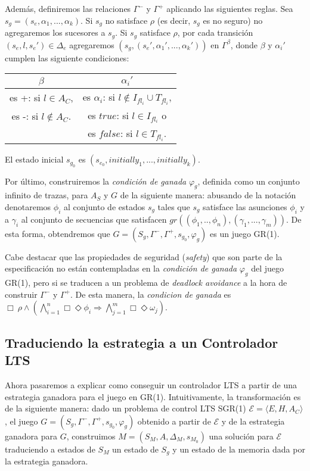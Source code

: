 Además, definiremos las relaciones $\Gamma^-$ y $\Gamma^+$ aplicando las siguientes reglas. Sea $s_g =
(s_e,\alpha_1,...,\alpha_k)$. Si $s_g$ no satisface $\rho$ (es decir, $s_g$ es no seguro) no agregaremos los sucesores a
$s_g$. Si $s_g$ satisface $\rho$, por cada transición $(s_e,l,s_e') \in \Delta_e$ agregaremos
$(s_g,(s_e',\alpha_1',...,\alpha_k'))$ en $\Gamma^{\beta}$, donde $\beta$ y $\alpha_i'$ cumplen las siguiente
condiciones:

\begin{center}
\begin{tabular}{ c | c}
$\beta$ & $\alpha_i'$ \\
\hline
es +: si $l \in A_C$, & es $\alpha_i$: si $l \notin I_{fl_i} \cup T_{fl_i}$, \\
es -: si $l \notin A_C$. & es $true$: si $l \in I_{fl_i}$ o \\
& es $false$: si $l \in T_{fl_i}$. \\
\end{tabular}
\end{center}

El estado inicial $s_{g_0}$ es $(s_{e_0},initially_1,...,initially_k)$.

Por último, construiremos la \emph{condición de ganada} $\varphi_g$, definida como un conjunto infinito de trazas, para
$A_S$ y $G$ de la siguiente manera: abusando de la notación denotaremos $\phi_i$ al conjunto de estados $s_g$ tales que
$s_g$ satisface las asunciones $\phi_i$ y a $\gamma_i$ al conjunto de secuencias que satisfacen
$gr((\phi_1,..,\phi_n),(\gamma_1,...,\gamma_m))$. De esta forma, obtendremos que $G = (S_g,\Gamma^-,\Gamma^+,s_{g_0},\varphi_g)$ es un
juego GR(1).

Cabe destacar que las propiedades de seguridad (\emph{safety}) que son parte de la especificación no están contempladas en la
\emph{condición de ganada} $\varphi_g$ del juego GR(1), pero si se traducen a un problema de \emph{deadlock avoidance} a
la hora de construir $\Gamma^-$ y $\Gamma^+$. De esta manera, la \emph{condicion de ganada} es  $\Box\ \rho
\wedge(\bigwedge_{i=1}^n\Box\Diamond\phi_i \Rightarrow \bigwedge_{j=1}^m \Box\Diamond\omega_j)$.

\subsection{Traduciendo la estrategia a un Controlador LTS}

Ahora pasaremos a explicar como conseguir un controlador LTS a partir de una estrategia ganadora para el juego en GR(1).
Intuitivamente, la transformación es de la siguiente manera: dado un problema de control LTS SGR(1) $\mathcal{E} =
\langle E,H,A_C\rangle$, el juego $G = (S_g, \Gamma^-, \Gamma^+, s_{g_0},\varphi_g)$ obtenido a partir de $\mathcal{E}$ y de la
estrategia ganadora para $G$, construimos $M = (S_M,A,\Delta_M,s_{M_0})$ una solución para $\mathcal{E}$ traduciendo
a estados de $S_M$ un estado de $S_g$ y un estado de la memoria dada por la estrategia ganadora.

